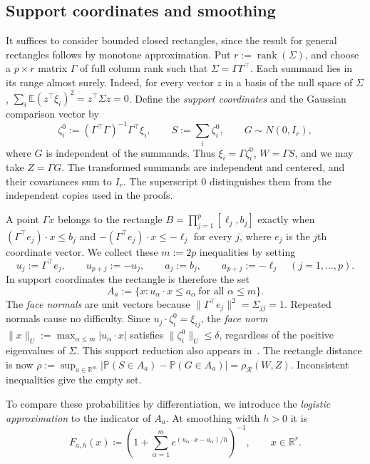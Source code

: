\documentclass[11pt,letterpaper]{article}
\theoremstyle{remark}
\newcommand{\E}{\mathbb E}
\newcommand{\Pp}{\mathbb P}
\newcommand{\R}{\mathbb R}
\newcommand{\rh}{\rho_{\mathcal R}}
\begin{document}
\subsection{Support coordinates and smoothing}\label{sec:outline-smoothing}
It suffices to consider bounded closed rectangles, since the result for
general rectangles follows by monotone approximation. Put
\(r:=\operatorname{rank}(\Sigma)\), and choose a \(p\times r\) matrix
\(\Gamma\) of full column rank such that \(\Sigma=\Gamma\Gamma^\top\).
Each summand lies in its range almost surely. Indeed, for every vector
\(z\) in a basis of the null space of \(\Sigma\),
\(\sum_i\E(z^\top\xi_i)^2=z^\top\Sigma z=0\). Define the
\emph{support coordinates} and the Gaussian comparison vector by
\[
 \zeta_i^0:=(\Gamma^\top\Gamma)^{-1}\Gamma^\top\xi_i,\qquad
 S:=\sum_i\zeta_i^0,\qquad G\sim N(0,I_r),
\]
where \(G\) is independent of the summands. Thus \(\xi_i=\Gamma\zeta_i^0\),
\(W=\Gamma S\), and we may take \(Z=\Gamma G\).
The transformed summands are independent and centered, and their
covariances sum to \(I_r\). The superscript \(0\) distinguishes them
from the independent copies used in the proofs.

A point \(\Gamma x\) belongs to the rectangle
\(B=\prod_{j=1}^p[\ell_j,b_j]\) exactly when
\((\Gamma^\top e_j)\cdot x\le b_j\) and
\(-(\Gamma^\top e_j)\cdot x\le-\ell_j\) for every \(j\), where \(e_j\)
is the \(j\)th coordinate vector. We collect these \(m:=2p\)
inequalities by setting
\[
 u_j:=\Gamma^\top e_j,\qquad u_{p+j}:=-u_j,\qquad
 a_j:=b_j,\qquad a_{p+j}:=-\ell_j\quad (j=1,\ldots,p).
\]
In support coordinates the rectangle is therefore the set
\[
 A_a:=\{x:u_\alpha\cdot x\le a_\alpha\ \text{for all }\alpha\le m\}.
\]
The \emph{face normals} are unit vectors because
\(\|\Gamma^\top e_j\|^2=\Sigma_{jj}=1\). Repeated normals cause no
difficulty. Since \(u_j\cdot\zeta_i^0=\xi_{ij}\), the \emph{face norm}
\(\|x\|_U:=\max_{\alpha\le m}|u_\alpha\cdot x|\) satisfies
\(\|\zeta_i^0\|_U\le\delta\), regardless of the positive eigenvalues
of \(\Sigma\). This support reduction also appears in~\cite[Section~2.3]{GaoZhang}.
The rectangle distance is now
\(\rho:=\sup_{a\in\R^m}|\Pp(S\in A_a)-\Pp(G\in A_a)|=\rh(W,Z)\).
Inconsistent inequalities give the empty set.

To compare these probabilities by differentiation, we introduce the
\emph{logistic approximation} to the indicator of \(A_a\). At smoothing
width \(h>0\) it is
\begin{equation}
 F_{a,h}(x)\coloneqq
 \left(1+\sum_{\alpha=1}^m
 e^{(u_\alpha\cdot x-a_\alpha)/h}\right)^{-1},
 \qquad x\in\R^r.
 \label{eq:selector}
\end{equation}
\end{document}
